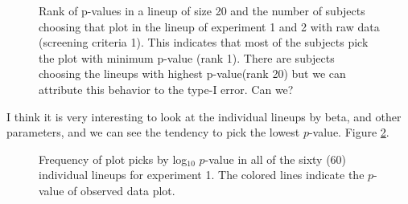 \documentclass{article}
\newcommand{\green}[1]{{\color{green} #1}} %
\begin{document}
\begin{figure}[hbtp]
   \centering
       \caption{Rank of p-values in a lineup of size 20 and the number of subjects choosing that plot in the lineup of experiment 1 and 2 with raw data (screening criteria 1). This indicates that most of the subjects pick the plot with minimum p-value (rank 1). There are subjects choosing the lineups with highest p-value(rank 20) but we can attribute this behavior to the type-I error. Can we?}
       \label{fig:P-val_rank}
\end{figure}

\green{I think it is very interesting to look at the individual lineups by beta, and other parameters, and we can see the tendency to pick the lowest $p$-value. Figure \ref{fig:P-val_log}.}

\begin{figure}[hbtp]
   \centering
       \caption{Frequency of plot picks by log$_10$ $p$-value in all of the sixty (60) individual lineups for experiment 1. The colored lines indicate the $p$-value of observed data plot.}
       \label{fig:P-val_log}
\end{figure}
\end{document}

